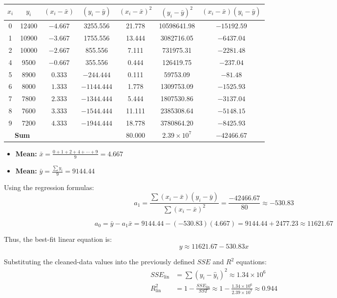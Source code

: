 \begin{table}[H]
\centering
\begin{tabular}{|c|c|c|c|c|c|c|}
\hline
$x_i$ & $y_i$ & $(x_i - \bar{x})$ & $(y_i - \bar{y})$ & $(x_i - \bar{x})^2$ & $(y_i - \bar{y})^2$ & $(x_i - \bar{x})(y_i - \bar{y})$ \\
\hline
0 & 12400 & $-4.667$ & 3255.556 & 21.778 & 10598641.98 & $-15192.59$ \\
1 & 10900 & $-3.667$ & 1755.556 & 13.444 & 3082716.05 & $-6437.04$ \\
2 & 10000 & $-2.667$ & 855.556 & 7.111 & 731975.31 & $-2281.48$ \\
4 & 9500 & $-0.667$ & 355.556 & 0.444 & 126419.75 & $-237.04$ \\
5 & 8900 & $0.333$ & $-244.444$ & 0.111 & 59753.09 & $-81.48$ \\
6 & 8000 & $1.333$ & $-1144.444$ & 1.778 & 1309753.09 & $-1525.93$ \\
7 & 7800 & $2.333$ & $-1344.444$ & 5.444 & 1807530.86 & $-3137.04$ \\
8 & 7600 & $3.333$ & $-1544.444$ & 11.111 & 2385308.64 & $-5148.15$ \\
9 & 7200 & $4.333$ & $-1944.444$ & 18.778 & 3780864.20 & $-8425.93$ \\
\hline
\multicolumn{2}{|c|}{\textbf{Sum}} & & & 80.000 & $2.39 \times 10^7$ & $-42466.67$ \\
\hline
\end{tabular}
\end{table}
\begin{itemize}
    \item \textbf{Mean:} $\bar{x} = \frac{0+1+2+4+\cdots+9}{9} = 4.667$
    \item \textbf{Mean:} $\bar{y} = \frac{\sum y_i}{9} = 9144.44$
\end{itemize}

Using the regression formulas:
\[
a_1 = \frac{\sum (x_i - \bar{x})(y_i - \bar{y})}{\sum (x_i - \bar{x})^2} = \frac{-42466.67}{80} \approx -530.83
\]

\[
a_0 = \bar{y} - a_1\bar{x} = 9144.44 - (-530.83)(4.667) = 9144.44 + 2477.23 \approx 11621.67
\]

Thus, the best-fit linear equation is:
\[
    y \approx 11621.67 - 530.83x
\]

Substituting the cleaned-data values into the previously defined $SSE$ and $R^2$ equations:
\begin{align*}
    SSE_{\text{lin}} &= \sum (y_i - \hat{y}_i)^2 \approx 1.34 \times 10^6 \\
    R^2_{\text{lin}} &= 1 - \frac{SSE_{\text{lin}}}{SST} \approx 1 - \frac{1.34 \times 10^6}{2.39 \times 10^7} \approx 0.944
\end{align*}

